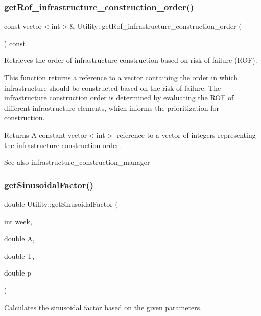 \subsubsection{\texorpdfstring{get\+Rof\+\_\+infrastructure\+\_\+construction\+\_\+order()}{getRof\_infrastructure\_construction\_order()}}
{\footnotesize\ttfamily const vector$<$int$>$\& Utility\+::get\+Rof\+\_\+infrastructure\+\_\+construction\+\_\+order (\begin{DoxyParamCaption}{ }\end{DoxyParamCaption}) const}



Retrieves the order of infrastructure construction based on risk of failure (R\+OF). 

This function returns a reference to a vector containing the order in which infrastructure should be constructed based on the risk of failure. The infrastructure construction order is determined by evaluating the R\+OF of different infrastructure elements, which informs the prioritization for construction.

\begin{DoxyReturn}{Returns}
A constant vector$<$int$>$ reference to a vector of integers representing the infrastructure construction order.
\end{DoxyReturn}
\begin{DoxySeeAlso}{See also}
infrastructure\+\_\+construction\+\_\+manager 
\end{DoxySeeAlso}
\mbox{\label{classUtility_affbfd106c7b5cdf6703d01d6ad838fde}} 
\subsubsection{\texorpdfstring{get\+Sinusoidal\+Factor()}{getSinusoidalFactor()}}
{\footnotesize\ttfamily double Utility\+::get\+Sinusoidal\+Factor (\begin{DoxyParamCaption}\item[{int}]{week,  }\item[{double}]{A,  }\item[{double}]{T,  }\item[{double}]{p }\end{DoxyParamCaption})}



Calculates the sinusoidal factor based on the given parameters. 


